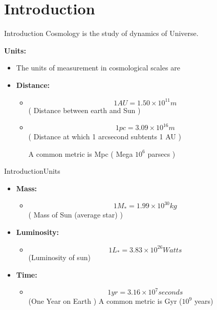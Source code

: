 
\small
\section{Introduction}
\begin{frame}{Introduction}
	Cosmology is the study of dynamics of Universe.

	\textbf{Units:}
	\begin{itemize}[<+->]
	\item
	The units of measurement in cosmological scales are

\item \textbf{Distance:} \begin{itemize}

	\small
\item $$ 1 AU = 1.50 \times 10^{11} m  $$
	\centering
	( Distance between earth and Sun )
\item $$ 1 pc = 3.09 \times 10^{16} m  $$
	\centering
	( Distance at which 1 arcsecond subtents 1 AU )

	\centering
	A common metric is Mpc ( Mega $10^6$ parsecs )
\end{itemize}
    \end{itemize}
\end{frame}

\begin{frame}{Introduction}{Units}

    \begin{itemize}[<+->]
\item \textbf{Mass:} \begin{itemize}

	\small
\item $$ 1 M_* = 1.99 \times 10^{30} kg  $$
	\centering
	( Mass of Sun (average star) )

\end{itemize}

\item  \textbf{Luminosity: } \begin{itemize}
		\item $$ 1 L_* = 3.83 \times 10^{26} Watts $$
	\centering
			(Luminosity of sun)
	\end{itemize}

\item \textbf{Time:}
 \begin{itemize}[<+->]
		\item $$ 1 yr = 3.16 \times 10^{7} seconds $$
			(One Year on Earth ) A common metric is Gyr ($10^9$
			years)
	\end{itemize}


    \end{itemize}
\end{frame}


